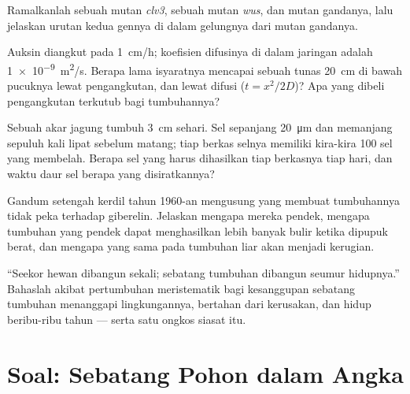 \begin{exercise}[$\star\star$]\label{exo:b2:plant-meristems:8}
Ramalkanlah  sebuah mutan \emph{clv3}, sebuah mutan \emph{wus},
dan mutan gandanya, lalu jelaskan urutan kedua gennya di dalam
gelungnya dari mutan gandanya.
\end{exercise}

\begin{exercise}[$\star\star$]\label{exo:b2:plant-meristems:9}
Auksin diangkut pada \qty{1}{cm/h}; koefisien difusinya di dalam
jaringan adalah \qty{1e-9}{m^2/s}. Berapa lama isyaratnya mencapai
sebuah tunas \qty{20}{cm} di bawah pucuknya lewat pengangkutan, dan
lewat difusi ($t = x^2/2D$)? Apa yang dibeli pengangkutan terkutub bagi
tumbuhannya?
\end{exercise}

\begin{exercise}[$\star\star\star$]\label{exo:b2:plant-meristems:10}
Sebuah akar jagung tumbuh \qty{3}{cm} sehari. Sel 
sepanjang \qty{20}{\micro m} dan memanjang sepuluh kali lipat sebelum
matang; tiap berkas selnya memiliki kira-kira \num{100} sel yang
membelah. Berapa sel yang harus dihasilkan  tiap berkasnya tiap
hari, dan waktu daur sel berapa yang disiratkannya?
\end{exercise}

\begin{exercise}[$\star\star\star$]\label{exo:b2:plant-meristems:11}
Gandum setengah kerdil tahun 1960-an mengusung  yang membuat
tumbuhannya tidak peka terhadap giberelin. Jelaskan mengapa mereka
pendek, mengapa tumbuhan yang pendek dapat menghasilkan lebih banyak
bulir ketika dipupuk berat, dan mengapa  yang sama pada tumbuhan
liar akan menjadi kerugian.
\end{exercise}

\begin{exercise}[$\star\star\star$]\label{exo:b2:plant-meristems:12}
``Seekor hewan dibangun sekali; sebatang tumbuhan dibangun seumur
hidupnya.'' Bahaslah akibat pertumbuhan meristematik bagi kesanggupan
sebatang tumbuhan menanggapi lingkungannya, bertahan dari kerusakan,
dan hidup beribu-ribu tahun --- serta satu ongkos siasat itu.
\end{exercise}

\section{Soal: Sebatang Pohon dalam Angka}

